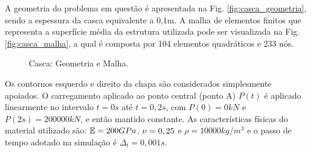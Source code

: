 \documentclass[tese_patricia]{subfiles}
\begin{document}
A geometria do problema em questão é apresentada na Fig. \ref{fig:casca_geometria}, sendo a espessura da casca equivalente a 0,1m.  A malha de elementos finitos que representa a superfície média da estrutura utilizada pode ser visualizada na Fig. \ref{fig:casca_malha}, a qual é composta por 104 elementos quadráticos e 233 nós. 

\begin{figure}[!htb]
	\centering
	\caption{Casca: Geometria e Malha.}
	\label{fig:Casca}
\end{figure}

Os contornos esquerdo e direito da chapa são considerados simplesmente apoiados. O carregamento aplicado ao ponto central (ponto A) $P(t)$ é aplicado linearmente no intervalo $t=0s$ até $t=0,2s$, com $P(0)=0kN$ e $P(2s) = 200000kN$, e então mantido constante. As características físicas do material utilizado são: $\mathbb{E} = 200GPa$, $\nu = 0,25$ e $\rho = 10000 kg/m^3$ e o passo de tempo adotado na simulação é $\Delta_{t} = 0,001s$.
\end{document}
